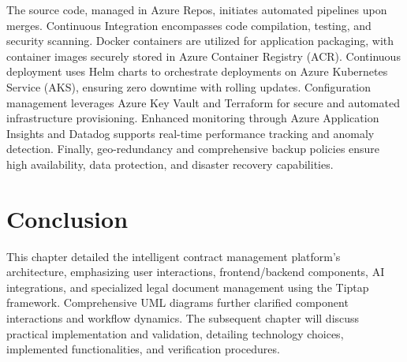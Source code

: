 The source code, managed in Azure Repos, initiates automated pipelines upon merges. Continuous Integration encompasses code compilation, testing, and security scanning. Docker containers are utilized for application packaging, with container images securely stored in Azure Container Registry (ACR). Continuous deployment uses Helm charts to orchestrate deployments on Azure Kubernetes Service (AKS), ensuring zero downtime with rolling updates. Configuration management leverages Azure Key Vault and Terraform for secure and automated infrastructure provisioning. Enhanced monitoring through Azure Application Insights and Datadog supports real-time performance tracking and anomaly detection. Finally, geo-redundancy and comprehensive backup policies ensure high availability, data protection, and disaster recovery capabilities.

\section{Conclusion}
This chapter detailed the intelligent contract management platform’s architecture, emphasizing user interactions, frontend/backend components, AI integrations, and specialized legal document management using the Tiptap framework. Comprehensive UML diagrams further clarified component interactions and workflow dynamics. The subsequent chapter will discuss practical implementation and validation, detailing technology choices, implemented functionalities, and verification procedures.